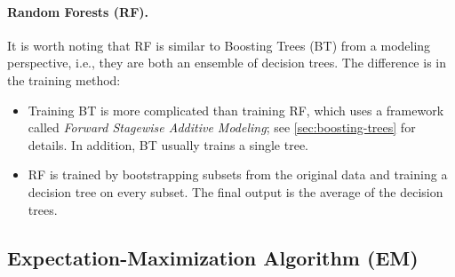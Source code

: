     \paragraph{Random Forests (RF).} It is worth noting that RF is similar to Boosting Trees (BT) from a modeling perspective, i.e., they are both an ensemble of decision trees.
    The difference is in the training method:
        \begin{itemize}
            \item Training BT is more complicated than training RF, which uses a framework called \emph{Forward Stagewise Additive Modeling}; see \ref{sec:boosting-trees} for details.
            In addition, BT usually trains a single tree.
            \item RF is trained by bootstrapping subsets from the original data and training a decision tree on every subset. 
            The final output is the average of the decision trees.
        \end{itemize}



\subsection{Expectation-Maximization Algorithm (EM)}



